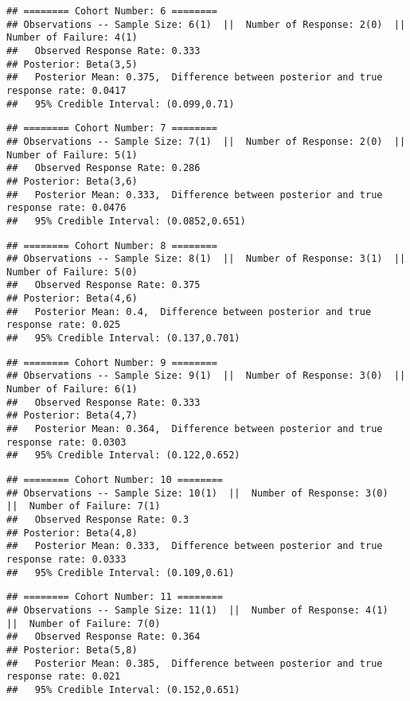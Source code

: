 \documentclass[]{article}
\begin{document}
\begin{verbatim}
## ======== Cohort Number: 6 ======== 
## Observations -- Sample Size: 6(1)  ||  Number of Response: 2(0)  ||  Number of Failure: 4(1)
##   Observed Response Rate: 0.333
## Posterior: Beta(3,5) 
##   Posterior Mean: 0.375,  Difference between posterior and true response rate: 0.0417
##   95% Credible Interval: (0.099,0.71)
\end{verbatim}

\begin{verbatim}
## ======== Cohort Number: 7 ======== 
## Observations -- Sample Size: 7(1)  ||  Number of Response: 2(0)  ||  Number of Failure: 5(1)
##   Observed Response Rate: 0.286
## Posterior: Beta(3,6) 
##   Posterior Mean: 0.333,  Difference between posterior and true response rate: 0.0476
##   95% Credible Interval: (0.0852,0.651)
\end{verbatim}

\begin{verbatim}
## ======== Cohort Number: 8 ======== 
## Observations -- Sample Size: 8(1)  ||  Number of Response: 3(1)  ||  Number of Failure: 5(0)
##   Observed Response Rate: 0.375
## Posterior: Beta(4,6) 
##   Posterior Mean: 0.4,  Difference between posterior and true response rate: 0.025
##   95% Credible Interval: (0.137,0.701)
\end{verbatim}

\begin{verbatim}
## ======== Cohort Number: 9 ======== 
## Observations -- Sample Size: 9(1)  ||  Number of Response: 3(0)  ||  Number of Failure: 6(1)
##   Observed Response Rate: 0.333
## Posterior: Beta(4,7) 
##   Posterior Mean: 0.364,  Difference between posterior and true response rate: 0.0303
##   95% Credible Interval: (0.122,0.652)
\end{verbatim}

\begin{verbatim}
## ======== Cohort Number: 10 ======== 
## Observations -- Sample Size: 10(1)  ||  Number of Response: 3(0)  ||  Number of Failure: 7(1)
##   Observed Response Rate: 0.3
## Posterior: Beta(4,8) 
##   Posterior Mean: 0.333,  Difference between posterior and true response rate: 0.0333
##   95% Credible Interval: (0.109,0.61)
\end{verbatim}

\begin{verbatim}
## ======== Cohort Number: 11 ======== 
## Observations -- Sample Size: 11(1)  ||  Number of Response: 4(1)  ||  Number of Failure: 7(0)
##   Observed Response Rate: 0.364
## Posterior: Beta(5,8) 
##   Posterior Mean: 0.385,  Difference between posterior and true response rate: 0.021
##   95% Credible Interval: (0.152,0.651)
\end{verbatim}
\end{document}
